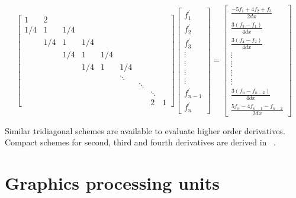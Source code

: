 \begin{equation}
 \label{eqn:compact-tridiagonal-system}
 \begin{bmatrix}
     1&2\\
     1/4&1&1/4\\
     &1/4&1&1/4\\
     &&1/4&1&1/4\\
     &&&1/4&1&1/4\\
     &&&&&\ddots\\
     &&&&&&\ddots\\
     &&&&&&&\ddots\\
     &&&&&&&2&1
  \end{bmatrix}
  \begin{bmatrix}
      f^{\prime}_1 \\

      f^{\prime}_2 \\
      f^{\prime}_3 \\
      \vdots \\
      \vdots \\
      \vdots \\
      \vdots \\
      f^{\prime}_{n-1} \\
      f^{\prime}_n
   \end{bmatrix}
 =
 \begin{bmatrix}
     \frac{-5f_1 + 4f_2 + f_3}{2dx}\\
     \frac{3(f_{3} - f_{1})}{4dx}\\
     \frac{3(f_{4} - f_{2})}{4dx}\\
     \vdots\\
     \vdots\\
     \vdots\\
     \vdots\\
     \frac{3(f_{n} - f_{n-2})}{4dx}\\
     \frac{5f_{n} - 4f_{n-1} - f_{n-2}}{2dx}
  \end{bmatrix}
\end{equation}

Similar tridiagonal schemes are available
to evaluate higher order derivatives.
Compact schemes for
second, third and fourth derivatives
are derived in ~\cite{lele1992compact}.

\section{Graphics processing units}


